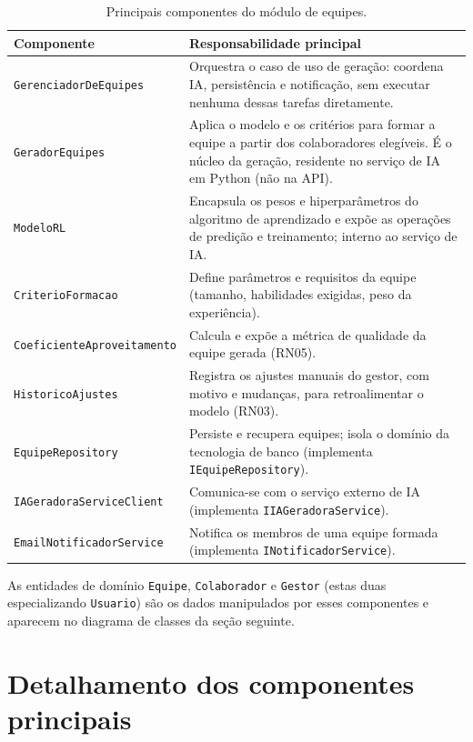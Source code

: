 \documentclass[a4paper,12pt,oneside,openany]{book}
\begin{document}
\begin{table}[H]
\centering
\caption{Principais componentes do módulo de equipes.}
\label{tab:componentes}
\begin{tabularx}{0.95\textwidth}{p{} X}
\toprule
\textbf{Componente} & \textbf{Responsabilidade principal} \\
\midrule
\texttt{GerenciadorDeEquipes} & Orquestra o caso de uso de geração: coordena IA,
persistência e notificação, sem executar nenhuma dessas tarefas diretamente. \\
\texttt{GeradorEquipes} & Aplica o modelo e os critérios para formar a equipe a
partir dos colaboradores elegíveis. É o núcleo da geração, residente no serviço de
IA em Python (não na API). \\
\texttt{ModeloRL} & Encapsula os pesos e hiperparâmetros do algoritmo de
aprendizado e expõe as operações de predição e treinamento; interno ao serviço de
IA. \\
\texttt{CriterioFormacao} & Define parâmetros e requisitos da equipe (tamanho,
habilidades exigidas, peso da experiência). \\
\texttt{CoeficienteAproveitamento} & Calcula e expõe a métrica de qualidade da
equipe gerada (RN05). \\
\texttt{HistoricoAjustes} & Registra os ajustes manuais do gestor, com motivo e
mudanças, para retroalimentar o modelo (RN03). \\
\texttt{EquipeRepository} & Persiste e recupera equipes; isola o domínio da
tecnologia de banco (implementa \texttt{IEquipeRepository}). \\
\texttt{IAGeradoraServiceClient} & Comunica-se com o serviço externo de IA
(implementa \texttt{IIAGeradoraService}). \\
\texttt{EmailNotificadorService} & Notifica os membros de uma equipe formada
(implementa \texttt{INotificadorService}). \\
\bottomrule
\end{tabularx}
\end{table}

As entidades de domínio \texttt{Equipe}, \texttt{Colaborador} e \texttt{Gestor}
(estas duas especializando \texttt{Usuario}) são os dados manipulados por esses
componentes e aparecem no diagrama de classes da seção seguinte.

\FloatBarrier

\section{Detalhamento dos componentes principais}
\end{document}
